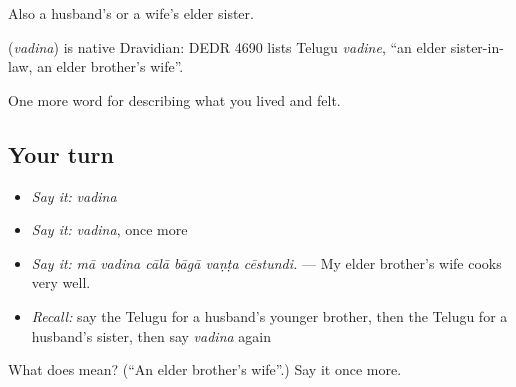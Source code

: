 Also a husband's or a wife's elder sister.

\begin{cousinweb}
\textbf{} (\emph{vadina}) is native Dravidian: DEDR 4690 lists Telugu \emph{vadine}, \textquotedblleft{}an elder sister-in-law, an elder brother's wife\textquotedblright{}.
\end{cousinweb}

\begin{grammarlens}[title={What you've built}]
One more word for describing what you lived and felt.
\end{grammarlens}

\subsection*{Your turn}
\begin{itemize}
\raggedright
  \item \emph{Say it:} \emph{vadina}
  \item \emph{Say it:} \emph{vadina}, once more
  \item \emph{Say it:} \emph{mā vadina cālā bāgā vaṇṭa cēstundi.} — My elder brother's wife cooks very well.
  \item \emph{Recall:} say the Telugu for a husband's younger brother, then the Telugu for a husband's sister, then say \emph{vadina} again
\end{itemize}

\begin{tcolorbox}[breakable,colback=teal!4,colframe=teal!35!black,title={Before you move on}]
What does  mean? (\textquotedblleft{}An elder brother's wife\textquotedblright{}.) Say it once more.
\end{tcolorbox}
